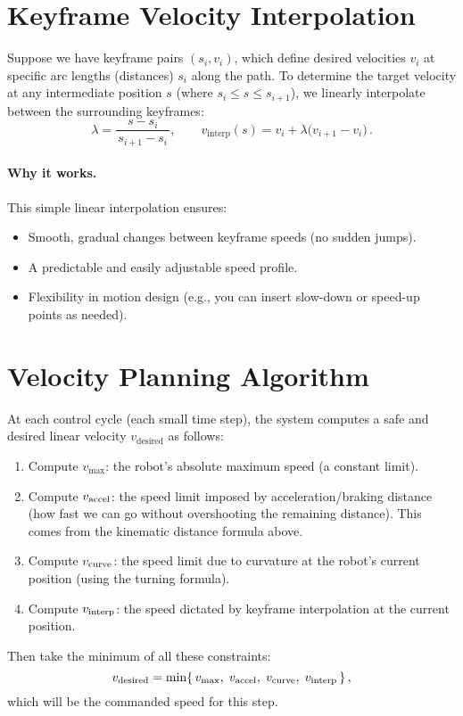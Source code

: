 \documentclass[11pt]{article}
\begin{document}
\section{Keyframe Velocity Interpolation}

Suppose we have keyframe pairs \((s_i, v_i)\), which define desired velocities \(v_i\) at specific arc lengths (distances) \(s_i\) along the path. To determine the target velocity at any intermediate position \(s\) (where $s_i \le s \le s_{i+1}$), we linearly interpolate between the surrounding keyframes:
\[
\lambda = \frac{s - s_i}{\,s_{i+1} - s_i\,}, 
\qquad
v_{\text{interp}}(s) = v_i + \lambda\big(v_{i+1} - v_i\big)\,.
\]

\paragraph{Why it works.} This simple linear interpolation ensures:
\begin{itemize}
  \item Smooth, gradual changes between keyframe speeds (no sudden jumps).
  \item A predictable and easily adjustable speed profile.
  \item Flexibility in motion design (e.g., you can insert slow-down or speed-up points as needed).
\end{itemize}

\section{Velocity Planning Algorithm}

At each control cycle (each small time step), the system computes a safe and desired linear velocity $v_{\text{desired}}$ as follows:
\begin{enumerate}
  \item Compute \(v_{\max}\): the robot’s absolute maximum speed (a constant limit).
  \item Compute \(v_{\rm accel}\): the speed limit imposed by acceleration/braking distance (how fast we can go without overshooting the remaining distance). This comes from the kinematic distance formula above.
  \item Compute \(v_{\rm curve}\): the speed limit due to curvature at the robot’s current position (using the turning formula).
  \item Compute \(v_{\rm interp}\): the speed dictated by keyframe interpolation at the current position.
\end{enumerate}
Then take the minimum of all these constraints:
\[
v_{\rm desired} = \min\{\,v_{\max},\;v_{\rm accel},\;v_{\rm curve},\;v_{\rm interp}\,\}\,,
\] 
which will be the commanded speed for this step.
\end{document}
